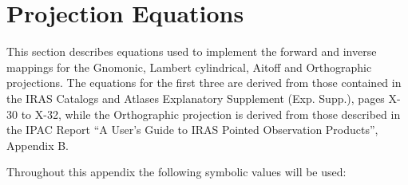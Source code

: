 \section {Projection Equations}
\label {APP:PROJ}

This section describes equations used to implement the forward and inverse
mappings for the Gnomonic, Lambert cylindrical, Aitoff and Orthographic
projections. The equations for the first three are derived from those contained
in the IRAS Catalogs and Atlases Explanatory Supplement (Exp. Supp.), pages X-30
to X-32, while the Orthographic projection is derived from those described in
the IPAC Report ``A User's Guide to IRAS Pointed Observation Products'',
Appendix B.

Throughout this appendix the following symbolic values will be used:

